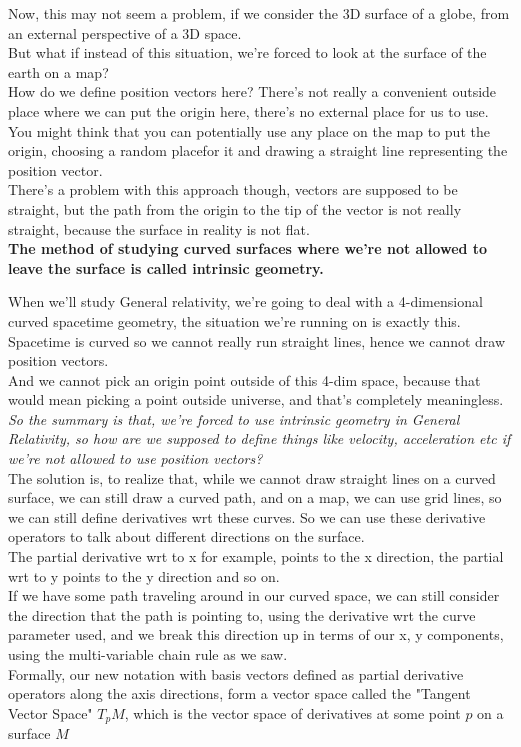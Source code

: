 Now, this may not seem a problem, if we consider the 3D surface of a globe, from an external perspective of a 3D space.\\
But what if instead of this situation, we're forced to look at the surface of the earth on a map?\\

How do we define position vectors here? There's not really a convenient outside place where we can put the origin here, 
there's no external place for us to use. You might think that you can potentially use any place on the map
to put the origin, choosing a random placefor it and drawing a straight line representing the position vector.\\

There's a problem with this approach though, vectors are supposed to be straight, but the path from the origin to the tip
of the vector is not really straight, because the surface in reality is not flat.\\

\textbf{The method of studying curved surfaces where we're not allowed to leave the surface is called intrinsic geometry.}

When we'll study General relativity, we're going to deal with a 4-dimensional curved spacetime geometry, the situation we're running 
on is exactly this. Spacetime is curved so we cannot really run straight lines, hence we cannot draw position vectors.\\

And we cannot pick an origin point outside of this 4-dim space, because that would mean picking a point outside universe, and that's completely
meaningless.\\

\textit{So the summary is that, we're forced to use intrinsic geometry in General Relativity, so how are we supposed to define things like
velocity, acceleration etc if we're not allowed to use position vectors?}\\

The solution is, to realize that, while we cannot draw straight lines on a curved surface, we can still 
draw a curved path, and on a map, we can use grid lines, so we can still define derivatives wrt these curves.
So we can use these derivative operators to talk about different directions on the surface.\\
The partial derivative wrt to x for example, points to the x direction, the partial wrt to y points to the y direction and so on.\\

If we have some path traveling around in our curved space, we can still consider the direction that the path 
is pointing to, using the derivative wrt the curve parameter used, and we break this direction up in terms of our x, y components, using the 
multi-variable chain rule as we saw.\\

Formally, our new notation with basis vectors defined as partial derivative operators along the axis directions, form 
a vector space called the "Tangent Vector Space" $T_p M$, which is the vector space of derivatives at some point $p$ on a surface $M$
